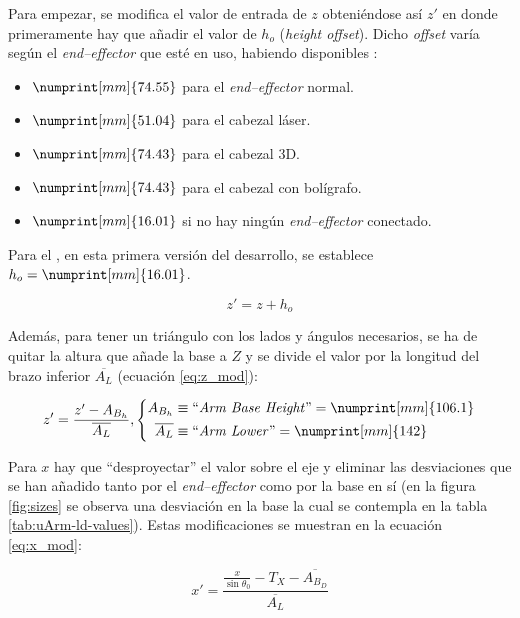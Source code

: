 Para empezar, se modifica el valor de entrada de $z$ obteniéndose así $z'$ en donde
primeramente hay que añadir el valor de $h_o$ (\textit{height offset}). Dicho \textit{offset}
varía según el \textit{end--effector} que esté en uso, habiendo disponibles \cite{UArmDeveloperSwiftProForArduino}:

\begin{itemize}
    \item $\numprint[mm]{74.55}$ para el \textit{end--effector} normal.
    \item $\numprint[mm]{51.04}$ para el cabezal láser.
    \item $\numprint[mm]{74.43}$ para el cabezal 3D.
    \item $\numprint[mm]{74.43}$ para el cabezal con bolígrafo.
    \item $\numprint[mm]{16.01}$ si no hay ningún \textit{end--effector} conectado.
\end{itemize}

Para el \pArm{}, en esta primera versión del desarrollo, se establece $h_o = \numprint[mm]{16.01}$.

\begin{equation}
    z' = z + h_o
\end{equation}

Además, para tener un triángulo con los lados y ángulos necesarios, se ha de quitar la
altura que añade la base a $Z$ y se divide el valor por la longitud del brazo inferior
$\overline{A_L}$ (ecuación \ref{eq:z_mod}):

\begin{equation}\label{eq:z_mod}
    z' = \frac{z' - A_{B_h}}{\overline{A_L}},
    \left\{\begin{aligned}
        A_{B_h}        & \equiv \text{``\textit{Arm Base Height}''} = \numprint[mm]{106.1} \\
        \overline{A_L} & \equiv \text{``\textit{Arm Lower}''} = \numprint[mm]{142}
    \end{aligned}\right.
\end{equation}

Para $x$ hay que ``desproyectar'' el valor sobre el eje y eliminar las desviaciones
que se han añadido tanto por el \textit{end--effector} como por la base en sí (en la
figura \ref{fig:sizes} se observa una desviación en la base la cual se contempla
en la tabla \ref{tab:uArm-ld-values}). Estas modificaciones se muestran en la ecuación
\ref{eq:x_mod}:

\begin{equation}\label{eq:x_mod}
    x' = \frac{\frac{x}{\sin{\theta_0}} - T_X - \overline{A_{B_D}}}{\overline{A_L}}
\end{equation}


